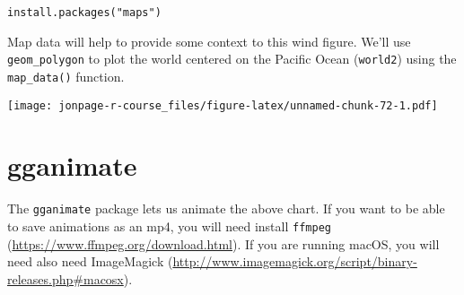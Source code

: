 \documentclass[]{book}
\newenvironment{Shaded}{\begin{snugshade}}{\end{snugshade}}
\newcommand{\KeywordTok}[1]{\textcolor[rgb]{0.13,0.29,0.53}{\textbf{{#1}}}}
\newcommand{\DataTypeTok}[1]{\textcolor[rgb]{0.13,0.29,0.53}{{#1}}}
\newcommand{\DecValTok}[1]{\textcolor[rgb]{0.00,0.00,0.81}{{#1}}}
\newcommand{\StringTok}[1]{\textcolor[rgb]{0.31,0.60,0.02}{{#1}}}
\newcommand{\OtherTok}[1]{\textcolor[rgb]{0.56,0.35,0.01}{{#1}}}
\newcommand{\NormalTok}[1]{{#1}}
\theoremstyle{definition}
\theoremstyle{definition}
\theoremstyle{remark}
\begin{document}
\begin{verbatim}
install.packages("maps")
\end{verbatim}

Map data will help to provide some context to this wind figure. We'll
use \texttt{geom\_polygon} to plot the world centered on the Pacific
Ocean (\texttt{world2}) using the \texttt{map\_data()} function.

\begin{Shaded}
\end{Shaded}

\texttt{[image: jonpage-r-course\_files/figure-latex/unnamed-chunk-72-1.pdf]}

\section{gganimate}\label{gganimate}

The \texttt{gganimate} package lets us animate the above chart. If you
want to be able to save animations as an mp4, you will need install
\texttt{ffmpeg} (\url{https://www.ffmpeg.org/download.html}). If you are
running macOS, you will need also need ImageMagick
(\url{http://www.imagemagick.org/script/binary-releases.php\#macosx}).
\end{document}
